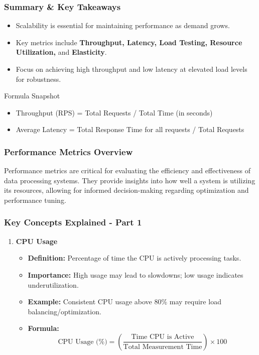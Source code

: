 \documentclass[aspectratio=169]{beamer}
\begin{document}
\begin{frame}[fragile]
    \frametitle{Summary \& Key Takeaways}
    \begin{itemize}
        \item Scalability is essential for maintaining performance as demand grows.
        \item Key metrics include \textbf{Throughput, Latency, Load Testing, Resource Utilization,} and \textbf{Elasticity}.
        \item Focus on achieving high throughput and low latency at elevated load levels for robustness.
    \end{itemize}
    \begin{block}{Formula Snapshot}
        \begin{itemize}
            \item Throughput (RPS) = Total Requests / Total Time (in seconds)
            \item Average Latency = Total Response Time for all requests / Total Requests
        \end{itemize}
    \end{block}
\end{frame}

\begin{frame}[fragile]
    \frametitle{Performance Metrics Overview}
    Performance metrics are critical for evaluating the efficiency and effectiveness of data processing systems. They provide insights into how well a system is utilizing its resources, allowing for informed decision-making regarding optimization and performance tuning.
\end{frame}

\begin{frame}[fragile]
    \frametitle{Key Concepts Explained - Part 1}
    \begin{enumerate}
        \item \textbf{CPU Usage}
        \begin{itemize}
            \item \textbf{Definition:} Percentage of time the CPU is actively processing tasks.
            \item \textbf{Importance:} High usage may lead to slowdowns; low usage indicates underutilization.
            \item \textbf{Example:} Consistent CPU usage above 80\% may require load balancing/optimization.
            \item \textbf{Formula:}
            \begin{equation}
            \text{CPU Usage (\%)} = \left( \frac{\text{Time CPU is Active}}{\text{Total Measurement Time}} \right) \times 100
            \end{equation}
        \end{itemize}
    \end{enumerate}
\end{frame}
\end{document}
